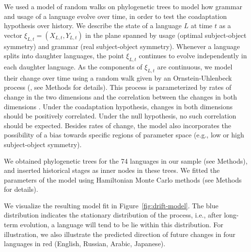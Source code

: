 \documentclass[11pt,a4paper]{article}
\begin{document}
We used a model of random walks on phylogenetic trees \citep{felsenstein1973maximum,pagel1997inferring, pagel2004bayesian} to model how grammar and usage of a language evolve over time, in order to test the coadaptation hypothesis over history.
We describe the state of a language $L$ at time $t$ as a vector $\xi_{L,t} = (X_{L,t}, Y_{L,t})$ in the plane spanned by usage (optimal subject-object symmetry) and grammar (real subject-object symmetry).
Whenever a language splits into daughter languages, the point $\xi_{L,t}$ continues to evolve independently in each daughter language.
As the components of $\xi_{L,t}$ are continuous, we model their change over time using a random walk given by an Ornstein-Uhlenbeck process (\citep{felsenstein1988phylogenies,hansen1997stabilizing, blackwell2003bayesian}, see Methods for details).
This process is parameterized by rates of change in the two dimensions and the correlation between the changes in both dimensions \citep{felsenstein1973maximum,hansen1997stabilizing, freckleton2012fast}.
Under the coadaptation hypothesis, changes in both dimensions should be positively correlated.
Under the null hypothesis, no such correlation should be expected.
Besides rates of change, the model also incorporates the possibility of a bias towards specific regions of parameter space (e.g., low or high subject-object symmetry).

We obtained phylogenetic trees for the 74 languages in our sample (see Methods), and inserted historical stages as inner nodes in these trees.
We fitted the parameters of the model using Hamiltonian Monte Carlo methods (see Methods for details).







We visualize the resulting model fit in Figure~\ref{fig:drift-model}.
The blue distribution indicates the stationary distribution of the process, i.e., after long-term evolution, a language will tend to be lie within this distribution.
For illustration, we also illustrate the predicted direction of future changes in four languages in red (English, Russian, Arabic, Japanese).
\end{document}
